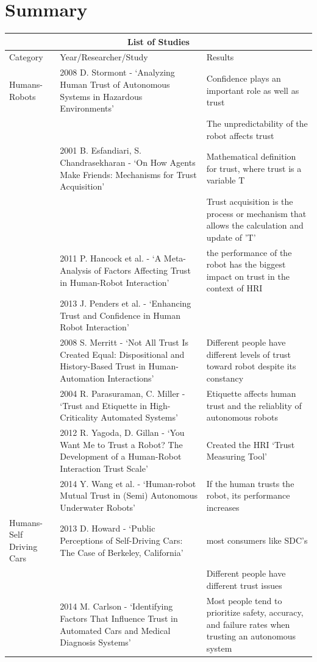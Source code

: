\documentclass[runningheads,a4paper]{llncs}
\begin{document}
\section{Summary}

\begin{center}
	

\begin{tabular}{ |p{2cm}|p{4cm}|p{6cm}|  }
\hline
\multicolumn{3}{|c|}{List of Studies} \\
\hline
Category & Year/Researcher/Study & Results \\
\hline
Humans-Robots & 2008 D. Stormont - `Analyzing Human Trust of Autonomous Systems in Hazardous Environments' & Confidence plays an important role as well as trust\\
 & & The unpredictability of the robot affects trust \\
\hline
 & 2001 B. Esfandiari, S. Chandrasekharan - `On How Agents Make Friends: Mechanisms for Trust Acquisition' & Mathematical definition for trust, where trust is a variable T\\
 & & Trust acquisition is the process or mechanism that allows the calculation and update of 'T' \\
\hline
& 2011 P. Hancock et al. - `A Meta-Analysis of Factors Affecting Trust in Human-Robot Interaction' & the performance of the robot has the biggest impact on trust in the context of HRI\\
\hline
& 2013 J. Penders et al. - `Enhancing Trust and Confidence in Human Robot Interaction' &  \\
\hline
& 2008 S. Merritt - `Not All Trust Is Created Equal: Dispositional and History-Based Trust in Human-Automation Interactions' & Different people have different levels of trust toward robot despite its constancy\\
\hline
& 2004 R. Parasuraman, C. Miller - `Trust and Etiquette in High-Criticality Automated Systems' & Etiquette affects human trust and the reliablity of autonomous robots\\
\hline
& 2012 R. Yagoda, D. Gillan - `You Want Me to Trust a Robot? The Development of a Human-Robot Interaction Trust Scale' & Created the HRI `Trust Measuring Tool'\\
\hline
& 2014 Y. Wang et al. - `Human-robot Mutual Trust in (Semi) Autonomous Underwater Robots' & If the human trusts the robot, its performance increases\\
\hline
Humans-Self Driving Cars & 2013 D. Howard - `Public Perceptions of Self-Driving Cars: The Case of Berkeley, California' & most consumers like SDC's\\
 & & Different people have different trust issues\\
\hline
& 2014 M. Carlson - `Identifying Factors That Influence Trust in Automated Cars and Medical Diagnosis Systems' & Most people tend to prioritize safety, accuracy, and failure rates when trusting an autonomous system\\
\hline
\end{tabular}
\end{center}
\end{document}
